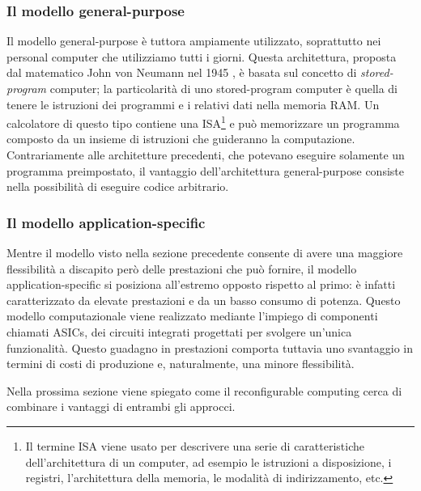 \subsubsection{Il modello general-purpose}
Il modello general-purpose è tuttora ampiamente utilizzato, soprattutto nei personal
computer che utilizziamo tutti i giorni. Questa architettura, proposta dal matematico
John von Neumann nel 1945 \cite{First-Draft-Report-EDVAC}, è basata sul concetto di
\emph{stored-program} computer; la particolarità di uno stored-program computer è quella
di tenere le istruzioni dei programmi e i relativi dati nella memoria RAM. Un calcolatore di
questo tipo contiene una \ac{ISA}\footnote{Il termine \acl{ISA} viene usato per descrivere
una serie di caratteristiche dell'architettura di un computer, ad esempio le istruzioni
a disposizione, i registri, l'architettura della memoria, le modalità di indirizzamento, etc.}
e può memorizzare un programma composto da un insieme di istruzioni che guideranno
la computazione. Contrariamente alle architetture precedenti, che potevano eseguire
solamente un programma preimpostato, il vantaggio dell'architettura general-purpose consiste
nella possibilità di eseguire codice arbitrario.

\subsubsection{Il modello application-specific}
Mentre il modello visto nella sezione precedente consente di avere una maggiore
flessibilità a discapito però delle prestazioni che può fornire, il modello
application-specific si posiziona all'estremo opposto rispetto al primo: è infatti
caratterizzato da elevate prestazioni e da un basso consumo di potenza. Questo modello
computazionale viene realizzato mediante l'impiego di componenti chiamati \acp{ASIC},
dei circuiti integrati progettati per svolgere un'unica funzionalità. Questo guadagno
in prestazioni comporta tuttavia uno svantaggio in termini di costi di produzione e,
naturalmente, una minore flessibilità.

Nella prossima sezione viene spiegato come il reconfigurable computing cerca di combinare
i vantaggi di entrambi gli approcci.


